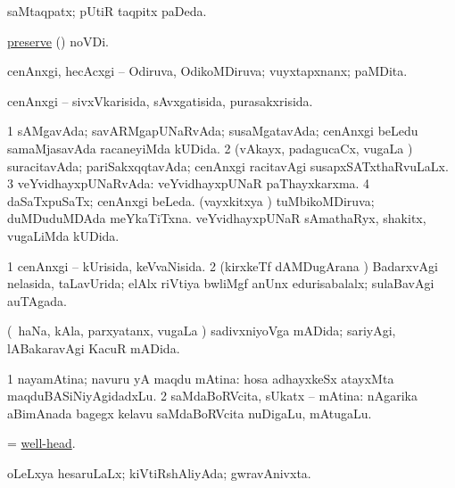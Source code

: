 \bentry
{} 
\gl{\gu}
\expl{}
\bmng
saMtaqpatx; pUtiR taqpitx paDeda. 
\emng
\eentry

\bentry
{} 
\gl{\gu}
\expl{}
\bmng
\hyperref{kandict_p.pdf}{P}{preserve(2)pagu}{preserve} (\pagu) noVDi. 
\emng
\eentry

\bentry 
{} 
\gl{\gu}
\expl{}
\bmng
cenAnxgi, hecAcxgi -- Odiruva, OdikoMDiruva; vuyxtapxnanx; paMDita. 
\emng
\eentry

\bentry
{} 
\gl{\gu}
\expl{}
\bmng
cenAnxgi -- sivxVkarisida, sAvxgatisida, purasakxrisida. 
\emng
\eentry

\bentry
{} 
\gl{\gu}
\expl{}
\bmng
\bnum
\num{1} sAMgavAda; savARMgapUNaRvAda; susaMgatavAda; cenAnxgi beLedu samaMjasavAda racaneyiMda kUDida. 
\num{2} (vAkayx, padagucaCx, \mo vugaLa \vi) suracitavAda; pariSakxqqtavAda; cenAnxgi racitavAgi susapxSATxthaRvuLaLx. 
\num{3} veYvidhayxpUNaRvAda:  veYvidhayxpUNaR paThayxkarxma. 
\num{4} daSaTxpuSaTx; cenAnxgi beLeda. 
 (vayxkitxya \vi) 
\banum
{} tuMbikoMDiruva; duMDuduMDAda meYkaTiTxna. 
 veYvidhayxpUNaR sAmathaRyx, shakitx, \mo vugaLiMda kUDida. 
\eanum
\numie
\enum
\emng
\eentry

\bentry
{} 
\gl{\gu}
\expl{}
\bmng
\bnum
\num{1} cenAnxgi -- kUrisida, keVvaNisida. 
\num{2} (kirxkeTf dAMDugArana \vi) BadarxvAgi nelasida, taLavUrida; elAlx riVtiya bwliMgf anUnx edurisabalalx; sulaBavAgi auTAgada. 
\enum
\emng
\eentry

\bentry
{} 
\gl{\gu}
\expl{}
\bmng
(\kanmu\ haNa, kAla, parxyatanx, \mo vugaLa \vi) sadivxniyoVga mADida; sariyAgi, lABakaravAgi KacuR mADida. 
\emng
\eentry

\bentry
{} 
\gl{\gu}
\expl{}
\bmng
\bnum
\num{1} nayamAtina; navuru yA maqdu mAtina:  hosa adhayxkeSx atayxMta maqduBASiNiyAgidadxLu. 
\num{2} saMdaBoRVcita, sUkatx -- mAtina:  nAgarika aBimAnada bagegx kelavu saMdaBoRVcita nuDigaLu, mAtugaLu. 
\enum
\emng
\eentry

\bentry
{} 
\gl{\nA}
\expl{}
\bmng
= \hyperlink{well-head}{well-head}. 
\emng
\eentry

\bentry
{} 
\gl{\gu}
\expl{}
\bmng
oLeLxya hesaruLaLx; kiVtiRshAliyAda; gwravAnivxta. 
\emng
\eentry


